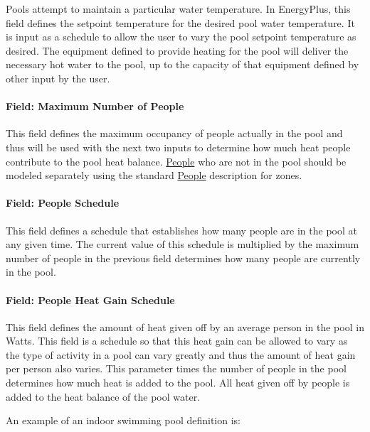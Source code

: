 Pools attempt to maintain a particular water temperature. In EnergyPlus, this field defines the setpoint temperature for the desired pool water temperature. It is input as a schedule to allow the user to vary the pool setpoint temperature as desired. The equipment defined to provide heating for the pool will deliver the necessary hot water to the pool, up to the capacity of that equipment defined by other input by the user.

\paragraph{Field: Maximum Number of People}\label{field-maximum-number-of-people}

This field defines the maximum occupancy of people actually in the pool and thus will be used with the next two inputs to determine how much heat people contribute to the pool heat balance. \hyperref[people]{People} who are not in the pool should be modeled separately using the standard \hyperref[people]{People} description for zones.

\paragraph{Field: People Schedule}\label{field-people-schedule}

This field defines a schedule that establishes how many people are in the pool at any given time. The current value of this schedule is multiplied by the maximum number of people in the previous field determines how many people are currently in the pool.

\paragraph{Field: People Heat Gain Schedule}\label{field-people-heat-gain-schedule}

This field defines the amount of heat given off by an average person in the pool in Watts. This field is a schedule so that this heat gain can be allowed to vary as the type of activity in a pool can vary greatly and thus the amount of heat gain per person also varies. This parameter times the number of people in the pool determines how much heat is added to the pool. All heat given off by people is added to the heat balance of the pool water.

An example of an indoor swimming pool definition is:

